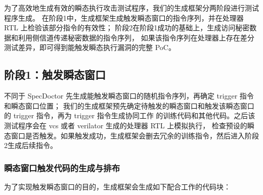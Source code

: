 为了高效地生成有效的瞬态执行攻击测试程序，我们的生成框架分两阶段进行测试程序生成。
在阶段1中，生成框架生成触发瞬态窗口的指令序列，并在处理器 RTL 上检验该部分指令的有效性；
阶段2在阶段1成功的基础上，生成访问秘密数据和利用侧信道传递秘密数据的指令序列，
如果该指令序列在处理器上存在差分测试差异，即可得到能触发瞬态执行漏洞的完整 PoC。\par

\subsection{阶段1：触发瞬态窗口}

不同于 SpecDoctor 先生成能触发瞬态窗口的随机指令序列，再确定 trigger 指令和瞬态窗口位置；
我们的生成框架预先确定待触发的瞬态窗口和触发该瞬态窗口的 trigger 指令，再为 trigger 指令生成协同工作
的训练代码和其他代码。之后该测试程序会在 vcs 或者 verilator\cite{snyder2013verilator} 生成的处理器 RTL 上模拟执行，
检查预设的瞬态窗口是否触发。如果触发成功，生成框架会删去冗余的训练指令，然后进入阶段2生成后续指令。\par

\subsubsection{瞬态窗口触发代码的生成与排布}

为了实现触发瞬态窗口的目的，生成框架会生成如下配合工作的代码块：\par

